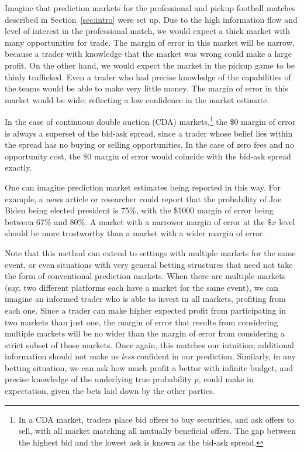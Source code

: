 \documentclass[sigconf,anonymous]{aamas}   %
\begin{document}
Imagine that prediction markets for the professional and pickup football matches described in Section~\ref{sec:intro} were set up. Due to the high information flow and level of interest in the professional match, we would expect a thick market with many opportunities for trade. The margin of error in this market will be narrow, because a trader with knowledge that the market was wrong could make a large profit. On the other hand, we would expect the market in the pickup game to be thinly trafficked. Even a trader who had precise knowledge of the capabilities of the teams would be able to make very little money. The margin of error in this market would be wide, reflecting a low confidence in the market estimate.

In the case of continuous double auction (CDA) markets,\footnote{In a CDA market, traders place bid offers to buy securities, and ask offers to sell, with all market matching all mutually beneficial offers. The gap between the highest bid and the lowest ask is known as the bid-ask spread.} the \$0 margin of error is always a superset of the bid-ask spread, since a trader whose belief lies within the spread has no buying or selling opportunities. In the case of zero fees and no opportunity cost, the \$0 margin of error would coincide with the bid-ask spread exactly.

One can imagine prediction market estimates being reported in this way. For example, a news article or researcher could report that the probability of Joe Biden being elected president is 75\%, with the \$1000 margin of error being between 67\% and 80\%. 
A market with a narrower margin of error at the $\$x$ level should be more trustworthy than a market with a wider margin of error.

Note that this method can extend to settings with multiple markets for the same event, or even situations with very general betting structures that need not take the form of conventional prediction markets. When there are multiple markets (say, two different platforms each have a market for the same event), we can imagine an informed trader who is able to invest in all markets, profiting from each one. Since a trader can make higher expected profit from participating in two markets than just one, the margin of error that results from considering multiple markets will be no wider than the margin of error from considering a strict subset of those markets. Once again, this matches our intuition; additional information should not make us \emph{less} confident in our prediction. Similarly, in any betting situation, we can ask how much profit a bettor with infinite budget, and precise knowledge of the underlying true probability $p$, could make in expectation, given the bets laid down by the other parties.
\end{document}
